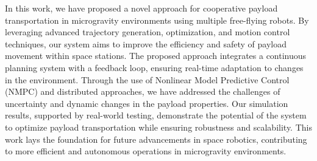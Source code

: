 In this work, we have proposed a novel approach for cooperative payload transportation in microgravity environments using multiple free-flying robots. By leveraging advanced trajectory generation, optimization, and motion control techniques, our system aims to improve the efficiency and safety of payload movement within space stations. The proposed approach integrates a continuous planning system with a feedback loop, ensuring real-time adaptation to changes in the environment. Through the use of Nonlinear Model Predictive Control (NMPC) and distributed approaches, we have addressed the challenges of uncertainty and dynamic changes in the payload properties. Our simulation results, supported by real-world testing, demonstrate the potential of the system to optimize payload transportation while ensuring robustness and scalability. This work lays the foundation for future advancements in space robotics, contributing to more efficient and autonomous operations in microgravity environments.

